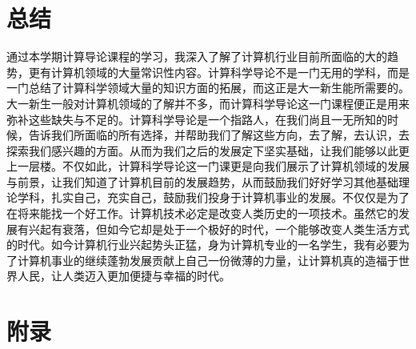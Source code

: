 \documentclass{article}
\begin{document}
\section{总结}
通过本学期计算导论课程的学习，我深入了解了计算机行业目前所面临的大的趋势，更有计算机领域的大量常识性内容。计算科学导论不是一门无用的学科，而是一门总结了计算科学领域大量的知识方面的拓展，而这正是大一新生能所需要的。大一新生一般对计算机领域的了解并不多，而计算科学导论这一门课程便正是用来弥补这些缺失与不足的。计算科学导论是一个指路人，在我们尚且一无所知的时候，告诉我们所面临的所有选择，并帮助我们了解这些方向，去了解，去认识，去探索我们感兴趣的方面。从而为我们之后的发展定下坚实基础，让我们能够以此更上一层楼。不仅如此，计算科学导论这一门课更是向我们展示了计算机领域的发展与前景，让我们知道了计算机目前的发展趋势，从而鼓励我们好好学习其他基础理论学科，扎实自己，充实自己，鼓励我们投身于计算机事业的发展。不仅仅是为了在将来能找一个好工作。计算机技术必定是改变人类历史的一项技术。虽然它的发展有兴起有衰落，但如今它却是处于一个极好的时代，一个能够改变人类生活方式的时代。如今计算机行业兴起势头正猛，身为计算机专业的一名学生，我有必要为了计算机事业的继续蓬勃发展贡献上自己一份微薄的力量，让计算机真的造福于世界人民，让人类迈入更加便捷与幸福的时代。\par


\section{附录}
\end{document}
